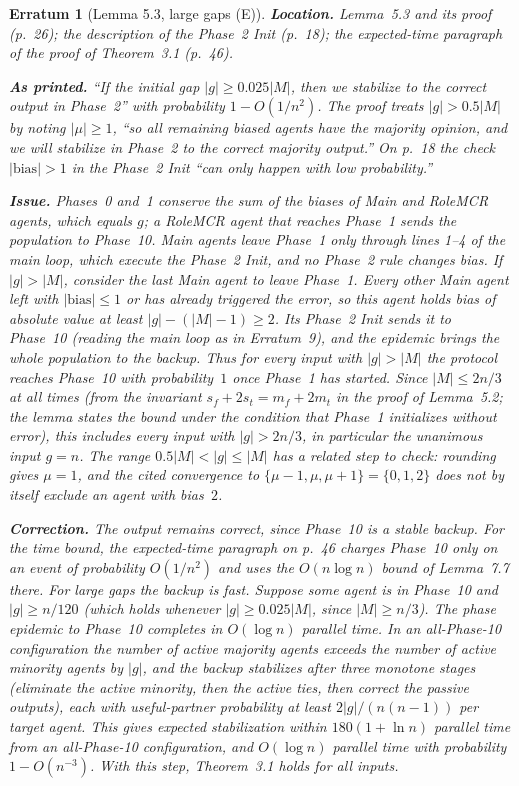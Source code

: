\documentclass[11pt]{article}
\theoremstyle{erratumstyle}
\newtheorem{erratum}{Erratum}
\begin{document}
\begin{erratum}[Lemma 5.3, large gaps (E)]
\textbf{Location.} Lemma~5.3 and its proof (p.~26); the description of the
Phase~2 Init (p.~18); the expected-time paragraph of the proof of
Theorem~3.1 (p.~46).

\medskip
\textbf{As printed.} ``If the initial gap $|g|\ge 0.025|M|$, then we stabilize
to the correct output in Phase~2'' with probability $1-O(1/n^2)$. The proof
treats $|g|>0.5|M|$ by noting $|\mu|\ge1$, ``so all remaining biased agents
have the majority opinion, and we will stabilize in Phase~2 to the correct
majority output.'' On p.~18 the check $|\mathrm{bias}|>1$ in the Phase~2 Init
``can only happen with low probability.''

\medskip
\textbf{Issue.} Phases~0 and~1 conserve the sum of the biases of Main and
RoleMCR agents, which equals $g$; a RoleMCR agent that reaches Phase~1 sends
the population to Phase~10. Main agents leave Phase~1 only through lines
1--4 of the main loop, which execute the Phase~2 Init, and no Phase~2 rule
changes bias. If $|g|>|M|$, consider the last Main agent to leave Phase~1.
Every other Main agent left with $|\mathrm{bias}|\le1$ or has already
triggered the error, so this agent holds bias of absolute value at least
$|g|-(|M|-1)\ge2$. Its Phase~2 Init sends it to Phase~10 (reading the main
loop as in Erratum~9), and the epidemic brings the whole population to the
backup. Thus for every input with $|g|>|M|$ the protocol reaches Phase~10
with probability~$1$ once Phase~1 has started. Since $|M|\le 2n/3$ at all
times (from the invariant $s_f+2s_t=m_f+2m_t$ in the proof of Lemma~5.2; the
lemma states the bound under the condition that Phase~1 initializes without
error), this includes every input with $|g|>2n/3$, in particular the
unanimous input $g=n$. The range $0.5|M|<|g|\le|M|$ has a related step to
check: rounding gives $\mu=1$, and the cited convergence to
$\{\mu-1,\mu,\mu+1\}=\{0,1,2\}$ does not by itself exclude an agent with
bias~$2$.

\medskip
\textbf{Correction.} The output remains correct, since Phase~10 is a stable
backup. For the time bound, the expected-time paragraph on p.~46 charges
Phase~10 only on an event of probability $O(1/n^2)$ and uses the
$O(n\log n)$ bound of Lemma~7.7 there. For large gaps the backup is fast.
Suppose some agent is in Phase~10 and $|g|\ge n/120$ (which holds whenever
$|g|\ge0.025|M|$, since $|M|\ge n/3$). The phase epidemic to Phase~10
completes in $O(\log n)$ parallel time. In an all-Phase-10 configuration the
number of active majority agents exceeds the number of active minority
agents by $|g|$, and the backup stabilizes after three monotone stages
(eliminate the active minority, then the active ties, then correct the
passive outputs), each with useful-partner probability at least
$2|g|/(n(n-1))$ per target agent. This gives expected stabilization within
$180(1+\ln n)$ parallel time from an all-Phase-10 configuration, and
$O(\log n)$ parallel time with probability $1-O(n^{-3})$. With this step,
Theorem~3.1 holds for all inputs.
\end{erratum}
\end{document}
